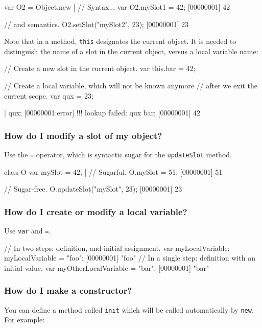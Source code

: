 \begin{urbiscript}
var O2 = Object.new |
// Syntax...
var O2.mySlot1 = 42;
[00000001] 42

// and semantics.
O2.setSlot("mySlot2", 23);
[00000001] 23
\end{urbiscript}

Note that in a method, \lstinline{this} designates the current
object.  It is needed to distinguish the name of a slot in the current
object, versus a local variable name:

\begin{urbiscript}
{
  // Create a new slot in the current object.
  var this.bar = 42;

  // Create a local variable, which will not be known anymore
  // after we exit the current scope.
  var qux = 23;
}|
qux;
[00000001:error] !!! lookup failed: qux
bar;
[00000001] 42
\end{urbiscript}


\subsubsection{How do I modify a slot of my object?}
Use the \lstinline|=| operator, which is syntactic sugar for the
\lstinline|updateSlot| method.

\begin{urbiscript}
class O
{
  var mySlot = 42;
}|
// Sugarful.
O.mySlot = 51;
[00000001] 51

// Sugar-free.
O.updateSlot("mySlot", 23);
[00000001] 23
\end{urbiscript}

\subsubsection{How do I create or modify a local variable?}
Use \lstinline|var| and \lstinline|=|.

\begin{urbiscript}
// In two steps: definition, and initial assignment.
var myLocalVariable;
myLocalVariable = "foo";
[00000001] "foo"
// In a single step: definition with an initial value.
var myOtherLocalVariable = "bar";
[00000001] "bar"
\end{urbiscript}


\subsubsection{How do I make a constructor?}
You can define a method called \lstinline{init} which will be called
automatically by \lstinline{new}. For example:

